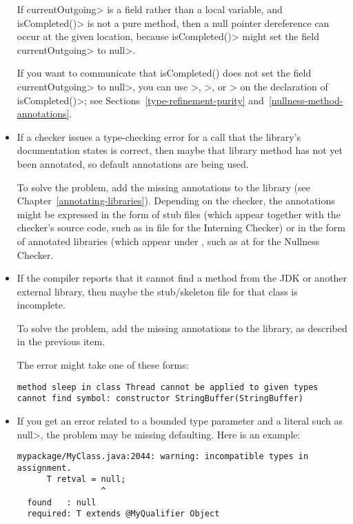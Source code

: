 \begin{itemize}
If \<currentOutgoing> is a field rather than a local variable, and
\<isCompleted()> is not a pure method, then a null pointer
dereference can occur at the given location, because \<isCompleted()> might set
the field \<currentOutgoing> to \<null>.

If you want to communicate that
isCompleted() does not set the field \<currentOutgoing> to \<null>, you can use
\<>,
\<>,
or \<> on the
declaration of \<isCompleted()>; see Sections~\ref{type-refinement-purity}
and~\ref{nullness-method-annotations}.


\item
If a checker issues a type-checking error for a call that the library's
documentation states is correct, then maybe that library method has not yet
been annotated, so default annotations are being used.

To solve the problem, add the missing annotations to the library (see
Chapter~\ref{annotating-libraries}).  Depending on the checker, the
annotations might be expressed in the form of stub files (which appear
together with the checker's source code, such as in file
 for the
Interning Checker) or in the form of annotated libraries (which appear
under , such as at  for
the Nullness Checker.

\item
If the compiler reports that it cannot find a method from the JDK or
another external library, then maybe the stub/skeleton file for that class
is incomplete.

To solve the problem, add the missing annotations to the library, as
described in the previous item.

The error might take one of these forms:

\begin{Verbatim}
method sleep in class Thread cannot be applied to given types
cannot find symbol: constructor StringBuffer(StringBuffer)
\end{Verbatim}

\item
If you get an error related to a bounded type parameter and a literal such
as \<null>, the problem may be missing defaulting.  Here is an example:

\begin{Verbatim}
mypackage/MyClass.java:2044: warning: incompatible types in assignment.
      T retval = null;
                 ^
  found   : null
  required: T extends @MyQualifier Object
\end{Verbatim}


\end{itemize}
